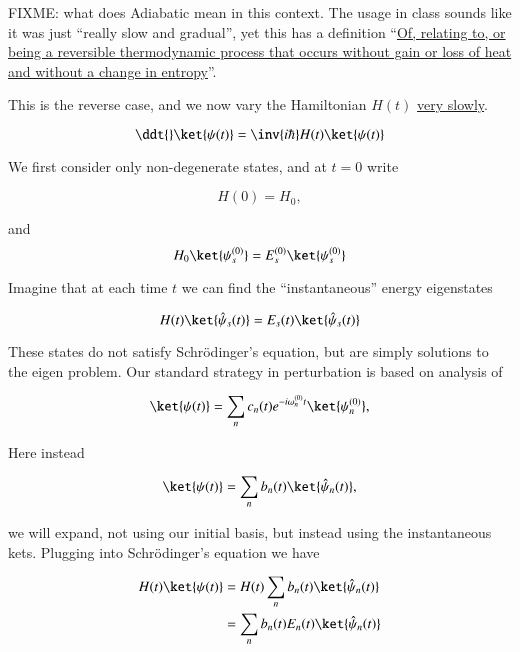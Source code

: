 FIXME: what does Adiabatic mean in this context.  The usage in class sounds like it was just ``really slow and gradual'', yet this has a definition ``\href{http://www.thefreedictionary.com/adiabatic}{Of, relating to, or being a reversible thermodynamic process that occurs without gain or loss of heat and without a change in entropy}''.

This is the reverse case, and we now vary the Hamiltonian $H(t)$ \underline{very slowly}.

\begin{equation}\label{eqn:qmTwoL8:150f}
\ddt{} \ket{\psi(t)} = \inv{i \hbar} H(t) \ket{\psi(t)}
\end{equation}

We first consider only non-degenerate states, and at $t = 0$ write

\begin{equation}\label{eqn:qmTwoL8:300}
H(0) = H_0,
\end{equation}

and
\begin{equation}\label{eqn:qmTwoL8:320}
H_0 \ket{\psi_s^{(0)}} = E_s^{(0)} \ket{\psi_s^{(0)}}
\end{equation}

Imagine that at each time $t$ we can find the ``instantaneous'' energy eigenstates

\begin{equation}\label{eqn:qmTwoL8:340}
H(t) \ket{\hat{\psi}_s(t)} = E_s(t) \ket{\hat{\psi}_s(t)} 
\end{equation}

These states do not satisfy Schr\"{o}dinger's equation, but are simply solutions to the eigen problem.  Our standard strategy in perturbation is based on analysis of

\begin{equation}\label{eqn:qmTwoL8:360}
\ket{\psi(t)} = \sum_n c_n(t) e^{- i \omega_n^{(0)} t} \ket{\psi_n^{(0)} },
\end{equation}

Here instead

\begin{equation}\label{eqn:qmTwoL8:380}
\ket{\psi(t)} = 
\sum_n b_n(t) \ket{\hat{\psi}_n(t)}
,
\end{equation}

we will expand, not using our initial basis, but instead using the instantaneous kets.  Plugging into Schr\"{o}dinger's equation we have

\begin{align*}
H(t) \ket{\psi(t)} 
&= H(t) \sum_n b_n(t) \ket{\hat{\psi}_n(t)} \\
&= \sum_n b_n(t) E_n(t) \ket{\hat{\psi}_n(t)} 
\end{align*}

